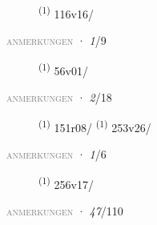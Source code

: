 \begin{description}
    \item[]  \textsuperscript{(1)} \mbox{116v16/}
\end{description}
\textsc{\textcolor{gray}{anmerkungen}}
\ENTRYEND
\noindent{} · \textit{1}/9 \LEMMALINE
\begin{description}
    \item[]  \textsuperscript{(1)} \mbox{56v01/}
\end{description}
\textsc{\textcolor{gray}{anmerkungen}}
\ENTRYEND
\noindent{} · \textit{2}/18 \LEMMALINE
\begin{description}
    \item[]  \textsuperscript{(1)} \mbox{151r08/} \CASEBREAK {} \textsuperscript{(1)} \mbox{253v26/}
\end{description}
\textsc{\textcolor{gray}{anmerkungen}}
\ENTRYEND
\noindent{} · \textit{1}/6 \LEMMALINE
\begin{description}
    \item[]  \textsuperscript{(1)} \mbox{256v17/}
\end{description}
\textsc{\textcolor{gray}{anmerkungen}}
\ENTRYEND
\noindent{} · \textit{47}/110 \LEMMALINE
